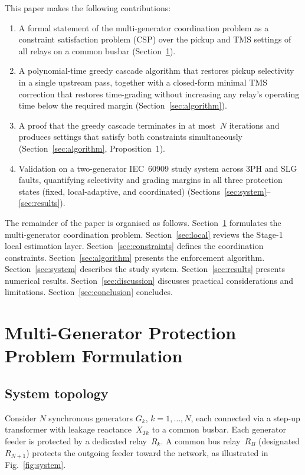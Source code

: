 \documentclass[journal,twoside,letterpaper]{IEEEtran}
\begin{document}
This paper makes the following contributions:
\begin{enumerate}
  \item A formal statement of the multi-generator coordination
    problem as a constraint satisfaction problem (CSP) over
    the pickup and TMS settings of all relays on a common
    busbar (Section~\ref{sec:problem}).
  \item A polynomial-time greedy cascade algorithm that
    restores pickup selectivity in a single upstream pass,
    together with a closed-form minimal TMS correction that
    restores time-grading without increasing any relay's
    operating time below the required margin
    (Section~\ref{sec:algorithm}).
  \item A proof that the greedy cascade terminates in at
    most~$N$ iterations and produces settings that satisfy
    both constraints simultaneously
    (Section~\ref{sec:algorithm}, Proposition~1).
  \item Validation on a two-generator IEC~60909 study system
    across 3PH and SLG faults, quantifying selectivity and
    grading margins in all three protection states
    (fixed, local-adaptive, and coordinated)
    (Sections~\ref{sec:system}--\ref{sec:results}).
\end{enumerate}

The remainder of the paper is organised as follows.
Section~\ref{sec:problem} formulates the multi-generator
coordination problem.
Section~\ref{sec:local} reviews the Stage-1 local estimation
layer.
Section~\ref{sec:constraints} defines the coordination
constraints.
Section~\ref{sec:algorithm} presents the enforcement algorithm.
Section~\ref{sec:system} describes the study system.
Section~\ref{sec:results} presents numerical results.
Section~\ref{sec:discussion} discusses practical considerations
and limitations.
Section~\ref{sec:conclusion} concludes.

\section{Multi-Generator Protection Problem Formulation}
\label{sec:problem}

\subsection{System topology}

Consider $N$ synchronous generators $G_k$, $k=1,\dots,N$,
each connected via a step-up transformer with leakage
reactance~$X_{Tk}$ to a common busbar.
Each generator feeder is protected by a dedicated relay~$R_k$.
A common bus relay~$R_B$ (designated $R_{N+1}$) protects the
outgoing feeder toward the network, as illustrated in
Fig.~\ref{fig:system}.
\end{document}

